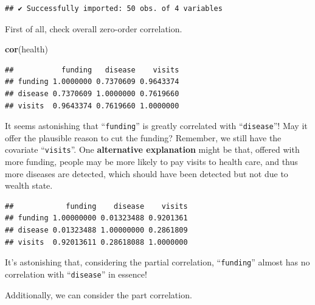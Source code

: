 \documentclass[
]{ctexart}
\newenvironment{Shaded}{\begin{snugshade}}{\end{snugshade}}
\newcommand{\FunctionTok}[1]{\textcolor[rgb]{0.13,0.29,0.53}{\textbf{#1}}}
\newcommand{\NormalTok}[1]{#1}
\newcommand{\SpecialCharTok}[1]{\textcolor[rgb]{0.81,0.36,0.00}{\textbf{#1}}}
\begin{document}
\begin{verbatim}
## ✔ Successfully imported: 50 obs. of 4 variables
\end{verbatim}

First of all, check overall zero-order correlation.

\begin{Shaded}
\begin{Highlighting}[]
\FunctionTok{cor}\NormalTok{(health)}
\end{Highlighting}
\end{Shaded}

\begin{verbatim}
##           funding   disease    visits
## funding 1.0000000 0.7370609 0.9643374
## disease 0.7370609 1.0000000 0.7619660
## visits  0.9643374 0.7619660 1.0000000
\end{verbatim}

It seems astonishing that ``\texttt{funding}'' is greatly correlated
with ``\texttt{disease}''! May it offer the plausible reason to cut the
funding? Remember, we still have the covariate ``\texttt{visits}''. One
\textbf{alternative explanation} might be that, offered with more
funding, people may be more likely to pay visits to health care, and
thus more diseases are detected, which should have been detected but not
due to wealth state.

\begin{Shaded}
\end{Shaded}

\begin{verbatim}
##            funding    disease    visits
## funding 1.00000000 0.01323488 0.9201361
## disease 0.01323488 1.00000000 0.2861809
## visits  0.92013611 0.28618088 1.0000000
\end{verbatim}

It's astonishing that, considering the partial correlation,
``\texttt{funding}'' almost has no correlation with ``\texttt{disease}''
in essence!

Additionally, we can consider the part correlation.

\begin{Shaded}
\end{Shaded}
\end{document}
